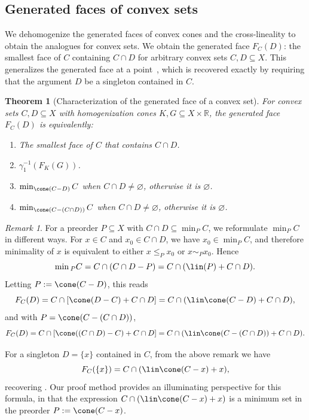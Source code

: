 \documentclass{article}
\theoremstyle{plain}
\newtheorem{theorem}{Theorem}[section]
\theoremstyle{definition}
\theoremstyle{remark}
\newtheorem{remark}[remark]{Remark}
\begin{document}
\subsection{Generated faces of convex sets}
\label{loc:body.lattice_minima.generated_faces_of_convex_sets}
We dehomogenize the generated faces of convex cones and the cross-lineality to obtain the
analogues for convex sets. We obtain the generated face $F_C(D)$: the smallest face of $C$
containing $C \cap D$ for arbitrary convex sets $C,D \subseteq X$.
This generalizes the generated face at a point~\cite{weisFaceGeneratedPoint2021},
which is recovered exactly by requiring that the argument $D$ be a singleton contained in $C$.
\begin{theorem}[Characterization of the generated face of a convex set]
\label{loc:characterization_of_the_generated_face_of_a_convex_set.statement}
For convex sets $C, D \subseteq X$ with homogenization cones $K, G \subseteq X \times \mathbb{R}$, the generated face 
$F_C(D)$ is equivalently:
\begin{enumerate}
\item The smallest face of $C$ that contains $C \cap D$.
\item $\gamma_1^{-1}(F_K(G))$.
\item $\min_{\cone(C-D)}C$ when $C \cap D \neq \varnothing$, otherwise it is $\varnothing$.
\item $\min_{\cone(C- (C \cap D))}C$ when $C \cap D \neq \varnothing$, otherwise it is $\varnothing$.
\end{enumerate}
\end{theorem}
\begin{remark}
\label{loc:characterization_of_the_generated_face_of_a_convex_set.remark}
For a preorder $P \subseteq X$ with $C \cap D \subseteq \min_P C$, we reformulate $\min_P C$ in different ways. For $x \in C$ and $x_0 \in C \cap D$, we have $x_0  \in \min_P C$, and therefore minimality of $x$ is equivalent to either $x \le_{P} x_0$ or $x \sim_{P} x_0$. Hence
\begin{equation*}
\min{}_P C = C \cap (C \cap D - P) = C \cap (\lin(P) + C \cap D).
\end{equation*}
Letting $P := \cone(C-D)$, this reads 
\begin{equation*}
F_C(D) = C \cap [\cone(D-C) + C \cap D] = C \cap (\lin\cone(C-D) + C \cap D),
\end{equation*}
and with $P = \cone(C - (C \cap D))$,
\begin{equation*}
F_C(D) = C \cap [\cone((C \cap D)-C) + C \cap D] = C \cap (\lin\cone(C- (C \cap D)) + C \cap D).
\end{equation*}
\end{remark}
For a singleton $D = \{x\}$ contained in $C$, from the above remark we have
\begin{equation*}
F_C(\{x\}) = C \cap (\lin \cone(C - x) + x),
\end{equation*}
recovering \cite[Proposition 2.4]{millanIntrinsicCoreMinimal2023}. Our proof method provides an illuminating perspective for this formula, in that the expression
$C \cap (\lin\cone(C-x) + x)$
is a minimum set in the preorder $P := \cone(C - x)$.
\end{document}
